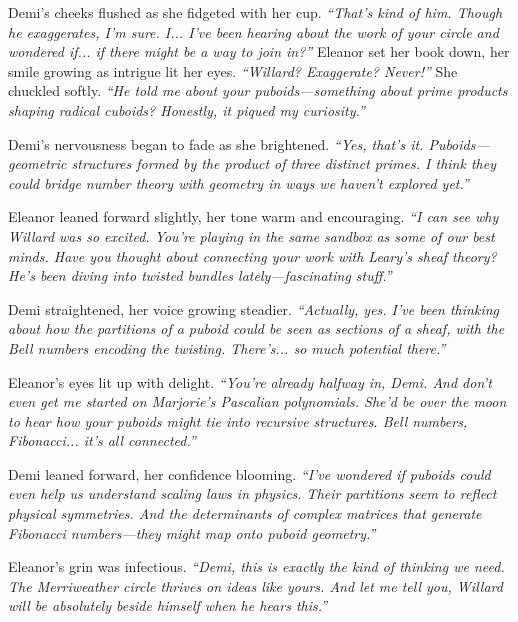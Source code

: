 Demi’s cheeks flushed as she fidgeted with her cup. \textit{“That’s kind of him. Though he exaggerates, I’m sure. I... I’ve been hearing about the work of your circle and wondered if... if there might be a way to join in?”}
\bigskip
Eleanor set her book down, her smile growing as intrigue lit her eyes. \textit{“Willard? Exaggerate? Never!”} She chuckled softly. \textit{“He told me about your puboids—something about prime products shaping radical cuboids? Honestly, it piqued my curiosity.”}
\bigskip

Demi’s nervousness began to fade as she brightened. \textit{“Yes, that’s it. Puboids—geometric structures formed by the product of three distinct primes. I think they could bridge number theory with geometry in ways we haven’t explored yet.”}
\bigskip

Eleanor leaned forward slightly, her tone warm and encouraging. \textit{“I can see why Willard was so excited. You’re playing in the same sandbox as some of our best minds. Have you thought about connecting your work with Leary’s sheaf theory? He’s been diving into twisted bundles lately—fascinating stuff.”}

\bigskip

Demi straightened, her voice growing steadier. \textit{“Actually, yes. I’ve been thinking about how the partitions of a puboid could be seen as sections of a sheaf, with the Bell numbers encoding the twisting. There’s... so much potential there.”}

\bigskip

Eleanor’s eyes lit up with delight. \textit{“You’re already halfway in, Demi. And don’t even get me started on Marjorie’s Pascalian polynomials. She’d be over the moon to hear how your puboids might tie into recursive structures. Bell numbers, Fibonacci... it’s all connected.”}

\bigskip

Demi leaned forward, her confidence blooming. \textit{“I’ve wondered if puboids could even help us understand scaling laws in physics. Their partitions seem to reflect physical symmetries. And the determinants of complex matrices that generate Fibonacci numbers—they might map onto puboid geometry.”}

\bigskip

Eleanor’s grin was infectious. \textit{“Demi, this is exactly the kind of thinking we need. The Merriweather circle thrives on ideas like yours. And let me tell you, Willard will be absolutely beside himself when he hears this.”}

